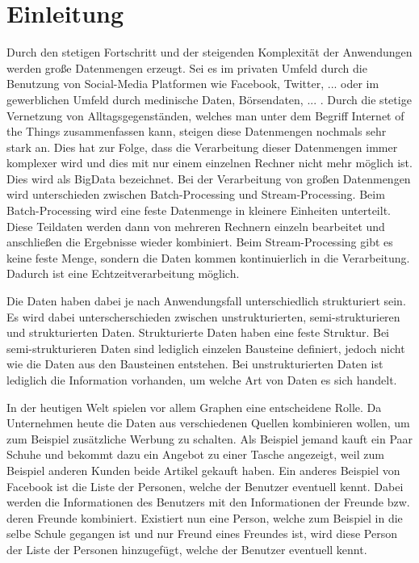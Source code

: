\chapter{Einleitung}
Durch den stetigen Fortschritt und der steigenden Komplexität der Anwendungen
werden große Datenmengen erzeugt. Sei es im privaten Umfeld durch die Benutzung
von Social-Media Platformen wie Facebook, Twitter, ... oder im gewerblichen
Umfeld durch medinische Daten, Börsendaten, ... . Durch die stetige Vernetzung
von Alltagsgegenständen, welches man unter dem Begriff Internet of the Things
zusammenfassen kann, steigen diese Datenmengen nochmals sehr stark an. Dies hat
zur Folge, dass die Verarbeitung dieser Datenmengen immer komplexer wird und dies
mit nur einem einzelnen Rechner nicht mehr möglich ist. Dies wird als BigData
bezeichnet. Bei der Verarbeitung von großen Datenmengen wird unterschieden
zwischen Batch-Processing und Stream-Processing. Beim Batch-Processing wird eine
feste Datenmenge in kleinere Einheiten unterteilt. Diese Teildaten werden dann
von mehreren Rechnern einzeln bearbeitet und anschließen die Ergebnisse wieder
kombiniert. Beim Stream-Processing gibt es keine feste Menge, sondern die Daten
kommen kontinuierlich in die Verarbeitung. Dadurch ist eine Echtzeitverarbeitung
möglich.

Die Daten haben dabei je nach Anwendungsfall unterschiedlich strukturiert sein.
Es wird dabei unterscherschieden zwischen unstrukturierten, semi-strukturieren
und strukturierten Daten. Strukturierte Daten haben eine feste Struktur. Bei
semi-strukturieren Daten sind lediglich einzelen Bausteine definiert,
jedoch nicht wie die Daten aus den Bausteinen entstehen. Bei unstrukturierten
Daten ist lediglich die Information vorhanden, um welche Art von Daten es sich
handelt.

In der heutigen Welt spielen vor allem Graphen eine entscheidene Rolle. Da 
Unternehmen heute die Daten aus verschiedenen Quellen kombinieren wollen, um zum
Beispiel zusätzliche Werbung zu schalten. Als Beispiel jemand kauft ein Paar
Schuhe und bekommt dazu ein Angebot zu einer Tasche angezeigt, weil zum
Beispiel anderen Kunden beide Artikel gekauft haben. Ein anderes Beispiel von
Facebook ist die Liste der Personen, welche der Benutzer eventuell kennt.
Dabei werden die Informationen des Benutzers mit den Informationen der Freunde
bzw. deren Freunde kombiniert. Existiert nun eine Person, welche zum Beispiel
in die selbe Schule gegangen ist und nur Freund eines Freundes ist, wird diese
Person der Liste der Personen hinzugefügt, welche der Benutzer eventuell kennt.

